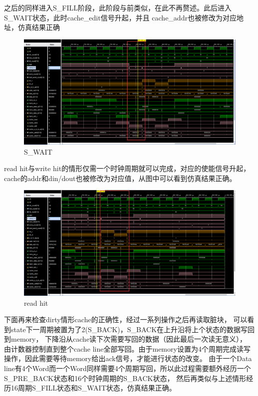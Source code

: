 之后的同样进入S\_FILL阶段，此阶段与前类似，在此不再赘述。此后进入S\_WAIT状态，此时cache\_edit信号升起，并且
cache\_addr也被修改为对应地址，仿真结果正确

\begin{figure}[H]
    \centering
    \includegraphics[width=1.0\textwidth]{figs/sres6.png}
    \caption{S\_WAIT}
    \label{Fig.9}
\end{figure}

read hit与write hit的情形仅需一个时钟周期就可以完成，对应的使能信号升起，
cache的addr和din/dout也被修改为对应值，从图中可以看到仿真结果正确。

\begin{figure}[H]
    \centering
    \includegraphics[width=1.0\textwidth]{figs/sres7.png}
    \caption{read hit}
    \label{Fig.10}
\end{figure}

下面再来检查dirty情形cache的正确性，经过一系列操作之后再读取脏块，
可以看到state下一周期被置为了2(S\_BACK)，S\_BACK在上升沿将上个状态的数据写回到memory，
下降沿从cache读下次需要写回的数据（因此最后一次读无意义），
由计数器控制直到整个cache line全部写回。由于memory设置为4个周期完成读写操作，因此需要等待memory给出ack信号，才能进行状态的改变。
由于一个Data line有4个Word而一个Word同样需要4个周期写回，所以此过程需要额外经历一个S\_PRE\_BACK状态和16个时钟周期的S\_BACK状态，
然后再类似与上述情形经历16周期S\_FILL状态和S\_WAIT状态，仿真结果正确。

